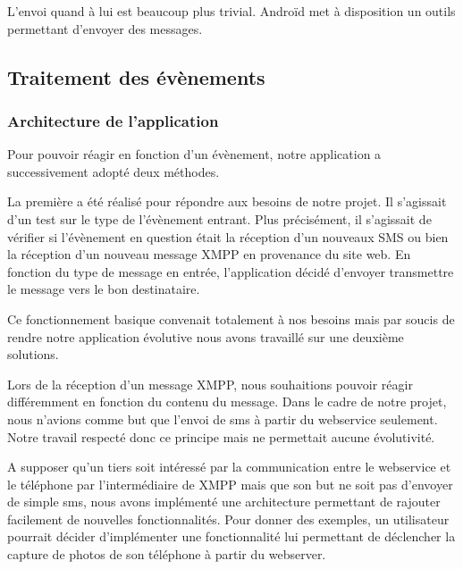 L'envoi quand à lui est beaucoup plus trivial. Androïd met à disposition un outils permettant d'envoyer
des messages.
\\



\subsection{Traitement des évènements}

\subsubsection{Architecture de l'application}

Pour pouvoir réagir en fonction d'un évènement, notre application a successivement adopté deux méthodes.

La première a été réalisé pour répondre aux besoins de notre projet. Il s'agissait d'un test sur le 
type de l'évènement entrant. Plus précisément, il s'agissait de vérifier si l'évènement en question 
était la réception d'un nouveaux SMS ou bien la réception d'un nouveau message XMPP en provenance du 
site web. En fonction du type de message en entrée, l'application décidé d'envoyer transmettre le message
vers le bon destinataire. 

Ce fonctionnement basique convenait totalement à nos besoins mais par soucis de rendre notre application
évolutive nous avons travaillé sur une deuxième solutions.

Lors de la réception d'un message XMPP, nous souhaitions pouvoir réagir différemment en fonction du contenu
du message. Dans le cadre de notre projet, nous n'avions comme but que l'envoi de sms à partir du webservice
seulement. Notre travail respecté donc ce principe mais ne permettait aucune évolutivité.

A supposer qu'un tiers soit intéressé par la communication entre le webservice et le téléphone par 
l'intermédiaire de XMPP mais que son but ne soit pas d'envoyer de simple sms, nous avons implémenté une
architecture permettant de rajouter facilement de nouvelles fonctionnalités. Pour donner des exemples, 
un utilisateur pourrait décider d'implémenter une fonctionnalité lui permettant de déclencher la capture
de photos de son téléphone à partir du webserver.

